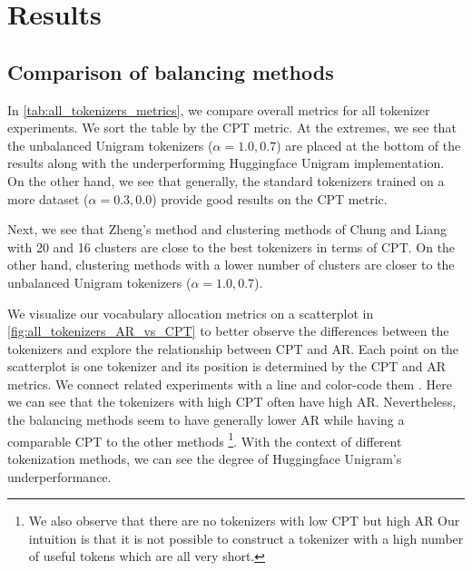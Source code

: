 \section{Results}

\subsection{Comparison of balancing methods}
\label{sec:comparison_balancing_methods}



In \autoref{tab:all_tokenizers_metrics}, we compare overall metrics for all tokenizer experiments. We sort the table by the CPT metric. At the extremes, we see that the unbalanced Unigram tokenizers ($\alpha=1.0, 0.7$) are placed at the bottom of the results along with the underperforming Huggingface Unigram implementation. On the other hand, we see that generally, the standard tokenizers trained on a more  dataset ($\alpha=0.3, 0.0$) provide good results on the CPT metric. 

Next, we see that Zheng's  method and clustering methods of Chung and Liang with 20 and 16 clusters are close to the best tokenizers in terms of CPT. On the other hand, clustering methods with a lower number of clusters are closer to the unbalanced Unigram tokenizers ($\alpha=1.0, 0.7$).

We visualize our vocabulary allocation metrics on a scatterplot in \autoref{fig:all_tokenizers_AR_vs_CPT} to better observe the differences between the tokenizers and explore the relationship between CPT and AR. Each point on the scatterplot is one tokenizer and its position is determined by the CPT and AR metrics. 
We connect related experiments with a line and color-code them . 
Here we can see that the tokenizers with high CPT often have high AR. Nevertheless, the balancing methods seem to have generally lower AR while having a comparable CPT to the other methods 
\footnote{We also observe that there are no tokenizers with low CPT but high AR Our intuition is that it is not possible to construct a tokenizer with a high number of useful tokens which are all very short.}. With the context of different tokenization methods, we can see the degree of Huggingface Unigram's underperformance.

